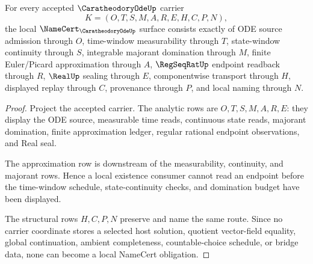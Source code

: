 \begin{theorem}
\label{thm:caratheodory-ode-namecert-obligations}
For every accepted $\CaratheodoryOdeUp$ carrier
$$
K=(O,T,S,M,A,R,E,H,C,P,N),
$$
the local $\NameCert_{\CaratheodoryOdeUp}$ surface consists exactly of ODE source admission through $O$, time-window measurability through $T$, state-window continuity through $S$, integrable majorant domination through $M$, finite Euler/Picard approximation through $A$, $\RegSeqRatUp$ endpoint readback through $R$, $\RealUp$ sealing through $E$, componentwise transport through $H$, displayed replay through $C$, provenance through $P$, and local naming through $N$.
\end{theorem}
\begin{proof}
Project the accepted carrier. The analytic rows are $O,T,S,M,A,R,E$: they display the ODE source, measurable time reads, continuous state reads, majorant domination, finite approximation ledger, regular rational endpoint observations, and Real seal.

The approximation row is downstream of the measurability, continuity, and majorant rows. Hence a local existence consumer cannot read an endpoint before the time-window schedule, state-continuity checks, and domination budget have been displayed.

The structural rows $H,C,P,N$ preserve and name the same route. Since no carrier coordinate stores a selected host solution, quotient vector-field equality, global continuation, ambient completeness, countable-choice schedule, or bridge data, none can become a local NameCert obligation.
\end{proof}




